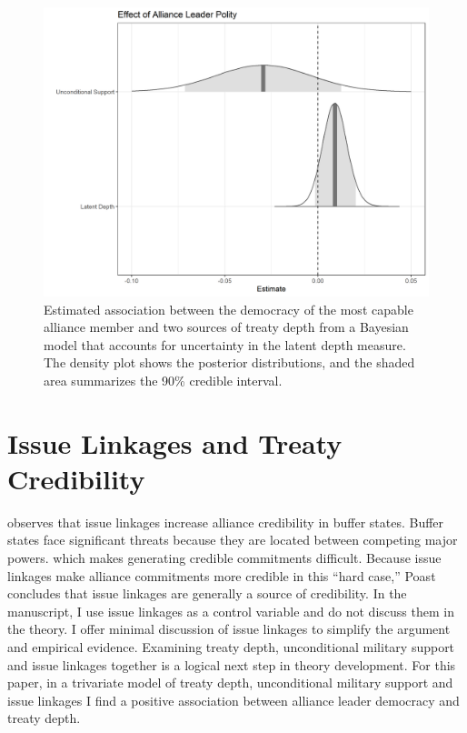\documentclass[12pt]{article}
\begin{document}
\begin{figure}
\includegraphics[width=.95\textwidth]{results-unc-depth.png}  
\caption{Estimated association between the democracy of the most capable alliance member and two sources of treaty depth from a Bayesian model that accounts for uncertainty in the latent depth measure. The density plot shows the posterior distributions, and the shaded area summarizes the 90\% credible interval.}
\label{fig:results-unc-depth}
\end{figure}



\section{Issue Linkages and Treaty Credibility}


\citep{Poast2013} observes that issue linkages increase alliance credibility in buffer states.
Buffer states face significant threats because they are located between competing major powers. which makes generating credible commitments difficult.
Because issue linkages make alliance commitments more credible in this ``hard case,'' Poast concludes that issue linkages are generally a source of credibility.
In the manuscript, I use issue linkages as a control variable and do not discuss them in the theory. 
I offer minimal discussion of issue linkages to simplify the argument and empirical evidence. 
Examining treaty depth, unconditional military support and issue linkages together is a logical next step in theory development. 
For this paper, in a trivariate model of treaty depth, unconditional military support and issue linkages I find a positive association between alliance leader democracy and treaty depth. 
\end{document}
